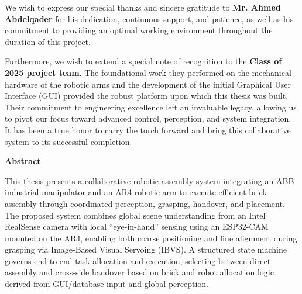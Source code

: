 \documentclass[11pt,a4paper,twoside]{report}
\begin{document}
We wish to express our special thanks and sincere gratitude to \textbf{Mr. Ahmed Abdelqader} for his dedication, continuous support, and patience, as well as his commitment to providing an optimal working environment throughout the duration of this project.

Furthermore, we wish to extend a special note of recognition to the \textbf{Class of 2025 project team}. The foundational work they performed on the mechanical hardware of the robotic arms and the development of the initial Graphical User Interface (GUI) provided the robust platform upon which this thesis was built. Their commitment to engineering excellence left an invaluable legacy, allowing us to pivot our focus toward advanced control, perception, and system integration. It has been a true honor to carry the torch forward and bring this collaborative system to its successful completion.
\clearpage

\vspace*{-2cm} %
\thispagestyle{plain}
\begin{center}
    {\Large \textbf{Abstract}} %
\end{center}

\vspace{1cm} %

This thesis presents a collaborative robotic assembly system integrating an ABB industrial manipulator and an AR4 robotic arm to execute efficient brick assembly through coordinated perception, grasping, handover, and placement. The proposed system combines global scene understanding from an Intel RealSense camera with local ``eye-in-hand'' sensing using an ESP32-CAM mounted on the AR4, enabling both coarse positioning and fine alignment during grasping via Image-Based Visual Servoing (IBVS). A structured state machine governs end-to-end task allocation and execution, selecting between direct assembly and cross-side handover based on brick and robot allocation logic derived from GUI/database input and global perception.
\end{document}
